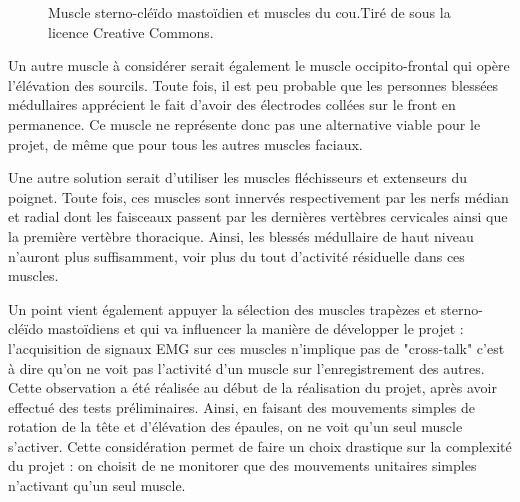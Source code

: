 \documentclass[letterpaper, twoside, 12pt, memoire, creativecommons, hyperref]{thETS}
\begin{document}
\begin{figure}
	\centering
	\caption{Muscle sterno-cléïdo mastoïdien et muscles du cou.Tiré de \cite{sternoWiki} sous la licence Creative Commons.}
	\label{fig:muscles}
\end{figure}


Un autre muscle à considérer serait également le muscle occipito-frontal qui opère l'élévation des sourcils. Toute fois, il est peu probable que les personnes blessées médullaires apprécient le fait d'avoir des électrodes collées sur le front en permanence. Ce muscle ne représente donc pas une alternative viable pour le projet, de même que pour tous les autres muscles faciaux.

Une autre solution serait d'utiliser les muscles fléchisseurs et extenseurs du poignet. Toute fois, ces muscles sont innervés respectivement par les nerfs médian et radial dont les faisceaux passent par les dernières vertèbres cervicales ainsi que la première vertèbre thoracique. Ainsi, les blessés médullaire de haut niveau n'auront plus suffisamment, voir plus du tout d'activité résiduelle dans ces muscles.

Un point vient également appuyer la sélection des muscles trapèzes et sterno-cléïdo mastoïdiens et qui va influencer la manière de développer le projet : l'acquisition de signaux EMG sur ces muscles n'implique pas de "cross-talk" c'est à dire qu'on ne voit pas l'activité d'un muscle sur l'enregistrement des autres. Cette observation a été réalisée au début de la réalisation du projet, après avoir effectué des tests préliminaires. Ainsi, en faisant des mouvements simples de rotation de la tête et d'élévation des épaules, on ne voit qu'un seul muscle s'activer. Cette considération permet de faire un choix drastique sur la complexité du projet : on choisit de ne monitorer que des mouvements unitaires simples n'activant qu'un seul muscle. 
\end{document}
